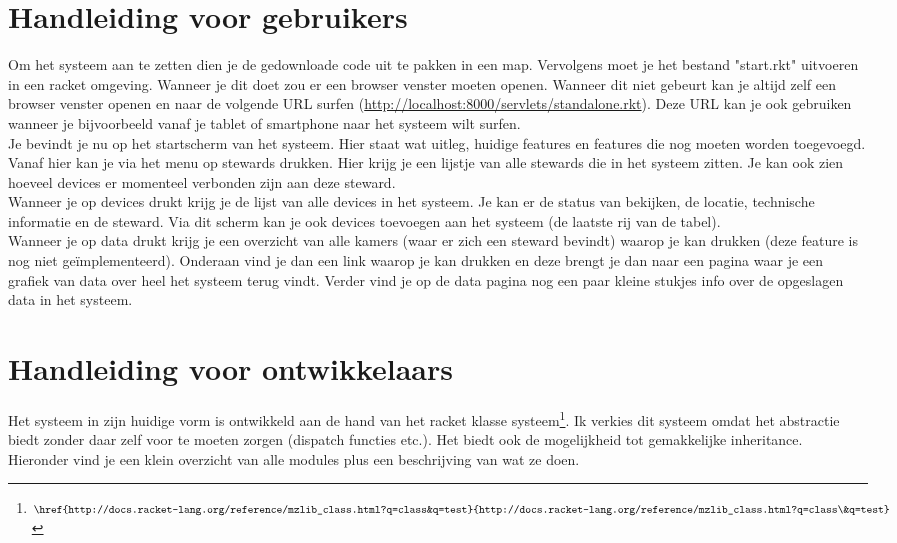\documentclass{article}
\begin{document}
\section{Handleiding voor gebruikers}
Om het systeem aan te zetten dien je de gedownloade code uit te pakken in een map. Vervolgens moet je het bestand "start.rkt" uitvoeren in een racket omgeving. Wanneer je dit doet zou er een browser venster moeten openen. Wanneer dit niet gebeurt kan je altijd zelf een browser venster openen en naar de volgende URL surfen (\href{http://localhost:8000/servlets/standalone.rkt}{http://localhost:8000/servlets/standalone.rkt}). Deze URL kan je ook gebruiken wanneer je bijvoorbeeld vanaf je tablet of smartphone naar het systeem wilt surfen.\\
Je bevindt je nu op het startscherm van het systeem. Hier staat wat uitleg, huidige features en features die nog moeten worden toegevoegd. Vanaf hier kan je via het menu op stewards drukken. Hier krijg je een lijstje van alle stewards die in het systeem zitten. Je kan ook zien hoeveel devices er momenteel verbonden zijn aan deze steward.\\
Wanneer je op devices drukt krijg je de lijst van alle devices in het systeem. Je kan er de status van bekijken, de locatie, technische informatie en de steward. Via dit scherm kan je ook devices toevoegen aan het systeem (de laatste rij van de tabel). \\
Wanneer je op data drukt krijg je een overzicht van alle kamers (waar er zich een steward bevindt) waarop je kan drukken (deze feature is nog niet ge\"{i}mplementeerd). Onderaan vind je dan een link waarop je kan drukken en deze brengt je dan naar een pagina waar je een grafiek van data over heel het systeem terug vindt. Verder vind je op de data pagina nog een paar kleine stukjes info over de opgeslagen data in het systeem.\\

\section{Handleiding voor ontwikkelaars}
Het systeem in zijn huidige vorm is ontwikkeld aan de hand van het racket klasse systeem\footnote{$\href{http://docs.racket-lang.org/reference/mzlib_class.html?q=class&q=test}{http://docs.racket-lang.org/reference/mzlib_class.html?q=class\&q=test}$}. Ik verkies dit systeem omdat het abstractie biedt zonder daar zelf voor te moeten zorgen (dispatch functies etc.). Het biedt ook de mogelijkheid tot gemakkelijke inheritance.\\
Hieronder vind je een klein overzicht van alle modules plus een beschrijving van wat ze doen.\\
\end{document}
